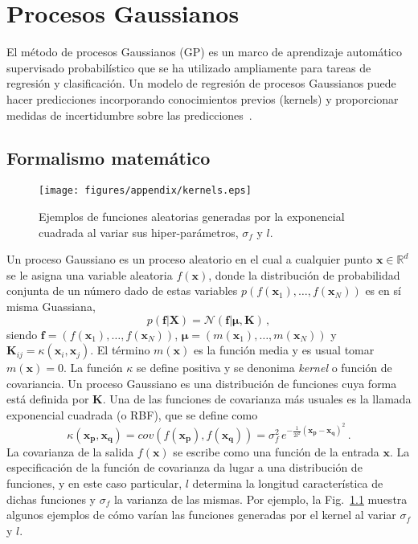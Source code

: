 \chapter{Procesos Gaussianos}
\label{app:gp}

El método de procesos Gaussianos (GP) es un marco de aprendizaje 
automático supervisado probabilístico que se ha utilizado ampliamente 
para tareas de regresión y clasificación. Un modelo de regresión de 
procesos Gaussianos puede hacer predicciones incorporando conocimientos 
previos (kernels) y proporcionar medidas de incertidumbre sobre las 
predicciones~\cite{Rasmussen:06}. 

\section*{Formalismo matemático}

\begin{figure}
\centering
\texttt{[image: figures/appendix/kernels.eps]}
\caption{Ejemplos de funciones aleatorias generadas por la exponencial 
cuadrada al variar sus hiper-parámetros, $\sigma_f$ y $l$.}
\label{fig:kernels}
\end{figure}

Un proceso Gaussiano es un proceso aleatorio en el cual a cualquier 
punto $\mathbf{x}\in \mathbb{R}^d$ se le asigna una variable aleatoria 
$f(\mathbf{x})$, donde la distribución de probabilidad conjunta de un 
número dado de estas variables 
$p(f(\mathbf{x}_1),\dots,f(\mathbf{x}_N))$ es en sí misma Guassiana,
\begin{equation}
p(\mathbf{f}|\mathbf{X})
=\mathcal{N}(\mathbf{f}|\boldsymbol{\mu},\mathbf{K})\,,
\end{equation}
siendo $\mathbf{f}=(f(\mathbf{x}_1),\dots,f(\mathbf{x}_N))$, 
$\boldsymbol\mu=(m(\mathbf{x}_1),\dots,m(\mathbf{x}_N))$ y 
$\mathbf{K}_{ij}=\kappa(\mathbf{x}_i,\mathbf{x}_j)$. El término 
$m(\mathbf{x})$ es la función media y es usual tomar $m(\mathbf{x})=0$.
La función $\kappa$ se define positiva y se denonima \textit{kernel}
o función de covariancia. Un proceso Gaussiano es una distribución de 
funciones cuya forma está definida por $\mathbf{K}$. Una de las 
funciones de covarianza más usuales es la llamada exponencial
cuadrada (o RBF), que se define como
\begin{equation}
\kappa(\mathbf{x}_{\mathbf{p}},\mathbf{x}_{\mathbf{q}})
=cov(f(\mathbf{x}_{\mathbf{p}}),f(\mathbf{x}_{\mathbf{q}}))
=\sigma_f^2\,e^{-\frac{1}{2l^2}(\mathbf{x}_{\mathbf{p}}
-\mathbf{x}_{\mathbf{q}})^2}\,.
\end{equation}
La covarianza de la salida $f(\mathbf{x})$ se escribe como una función 
de la entrada $\mathbf{x}$. La especificación de la función de 
covarianza da lugar a una distribución de funciones, y en este caso 
particular, $l$ determina la longitud característica de dichas funciones
y $\sigma_f$ la varianza de las mismas. Por ejemplo, la 
Fig.~\ref{fig:kernels} muestra algunos ejemplos de cómo varían las 
funciones generadas por el kernel al variar $\sigma_f$ y $l$.

